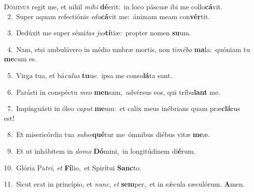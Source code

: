 \lettrine{\initial\textcolor{\initialcolor}{D}}{óminus} regit me, et nihil \textit{mi}\-\textit{hi} \textbf{dé}\-erit:~\star in loco páscuæ ibi me collo\-\textbf{cá}\-vit.\\
{\numbfont\textcolor{\numbcolor}{~2.}}~Super aquam refectiónis \textit{e}\-\textit{du}\textbf{cá}vit me:~\star ánimam meam con\-\textbf{vér}\-tit.\par
{\numbfont\textcolor{\numbcolor}{~3.}}~Dedúxit me super sémi\textit{tas} \textit{jus}\-\textbf{tí}tiæ:~\star propter nomen \textbf{su}\-um.\par
{\numbfont\textcolor{\numbcolor}{~4.}}~Nam, etsi ambulávero in médio umbræ mortis, non ti\-\textit{mé}\-\textit{bo} \textbf{ma}\-la:~\star quóniam tu \textbf{me}\-cum es.\par
{\numbfont\textcolor{\numbcolor}{~5.}}~Virga tua, et bá\-\textit{cu}\-\textit{lus} \textbf{tu}\-us:~\star ipsa me conso\-\textbf{lá}\-ta sunt.\par
{\numbfont\textcolor{\numbcolor}{~6.}}~Parásti in conspéctu \textit{me}\-\textit{o} \textbf{men}\-sam,~\star advérsus eos, qui tríbu\textbf{lant} me.\par
{\numbfont\textcolor{\numbcolor}{~7.}}~Impinguásti in óleo \textit{ca}\-\textit{put} \textbf{me}\-um:~\star et calix meus inébrians quam præ\-\textbf{clá}\-rus est!\par
{\numbfont\textcolor{\numbcolor}{~8.}}~Et misericórdia tua \textit{sub}\-\textit{se}\textbf{qué}tur me~\star ómnibus diébus vitæ \textbf{me}\-æ.\par
{\numbfont\textcolor{\numbcolor}{~9.}}~Et ut inhábitem in \textit{do}\-\textit{mo} \textbf{Dó}\-mini,~\star in longitúdinem di\-\textbf{é}\-rum.\par
{\numbfont\textcolor{\numbcolor}{10.}}~Glória Pa\-\textit{tri}\-, \textit{et} \textbf{Fí}\-lio,~\star et Spirítui \textbf{Sanc}\-to.\par
{\numbfont\textcolor{\numbcolor}{11.}}~Sicut erat in princípio, et \textit{nunc}\-, \textit{et} \textbf{sem}\-per,~\star et in sǽcula sæculórum. \textbf{A}\-men.\par
